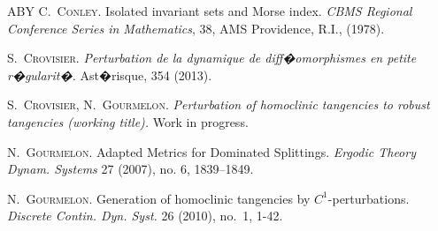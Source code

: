 \documentclass[11pt, a4paper]{amsart}
\theoremstyle{plain}
\theoremstyle{definition}
\theoremstyle{remark}
\numberwithin{equation}{section}         %
\begin{document}
\begin{thebibliography}{ABY}
\textsc{C.~Conley.}
Isolated invariant sets and Morse index.
\textit{CBMS Regional Conference Series
in Mathematics}, 38, AMS Providence, R.I., (1978).


\textsc{S.~Crovisier.}
\textit{Perturbation de la dynamique de diff�omorphismes en petite r�gularit�.}
Ast�risque, 354 (2013). 


\textsc{S.~Crovisier, N.~Gourmelon.}
\textit{Perturbation of homoclinic tangencies to robust tangencies (working title).}
Work in progress. 





%
%
%


\textsc{N.~Gourmelon.}
Adapted Metrics for Dominated Splittings. 
 {\it Ergodic Theory Dynam. Systems} 27 (2007), no. 6, 1839--1849.

\textsc{N.~Gourmelon.}
Generation of homoclinic tangencies by $C^1$-perturbations. 
{\it Discrete Contin. Dyn. Syst.} 26 (2010), no.~1, 1-42.

%

%
%
%



\end{thebibliography}
\end{document}
